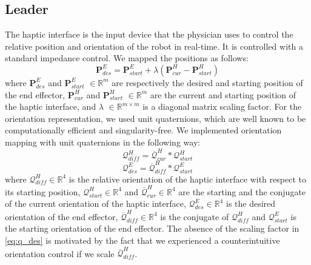 \subsection{Leader} 
The haptic interface is the input device that the physician uses to control the relative position and orientation of the robot in real-time. It is controlled with a standard impedance control. We mapped the positions as follows:
\begin{equation}
\boldsymbol{P}^E_{des} = \boldsymbol{P}^E_{start} + \lambda(\boldsymbol{P}^H_{cur} - \boldsymbol{P}^H_{start})
\end{equation}
where $\boldsymbol{P}^E_{des}$ and $\boldsymbol{P}^E_{start}$ $\in \mathbb{R}^{m}$ are respectively the desired and starting position of the end effector, $\boldsymbol{P}^H_{cur}$ and $\boldsymbol{P}^H_{start}$ $\in \mathbb{R}^{m}$ are the current and starting position of the haptic interface, and $\lambda$ $\in \mathbb{R}^{m \times m}$ is a diagonal matrix scaling factor.
For the orientation representation, we used unit quaternions, which are well known to be computationally efficient and singularity-free. We implemented orientation mapping with unit quaternions in the following way:
\begin{equation}
\mathcal{Q}^H_{diff} = \overline{\mathcal{Q}}^H_{cur} * \mathcal{Q}^H_{start}
\end{equation}
\begin{equation}
\mathcal{Q}^E_{des} =\overline{\mathcal{Q}}^H_{diff} * \mathcal{Q}^E_{start}
\label{eq:q_des}
\end{equation}
where $\mathcal{Q}^H_{diff}\in \mathbb{R}^4$ is the relative orientation of the haptic interface with respect to its starting position, $\mathcal{Q}^H_{start}\in \mathbb{R}^4$ and $\overline{\mathcal{Q}}^H_{cur} \in \mathbb{R}^4$ are the starting and the conjugate of the current orientation of the haptic interface, $\mathcal{Q}^E_{des}\in \mathbb{R}^4$ is the desired orientation of the end effector, $\overline{\mathcal{Q}}^H_{diff}\in \mathbb{R}^4$ is the conjugate of $\mathcal{Q}^H_{diff}$ and  $\mathcal{Q}^E_{start}$ is the starting orientation of the end effector. The absence of the scaling factor in \eqref{eq:q_des} is motivated by the fact that we experienced a counterintuitive orientation control if we scale $\overline{\mathcal{Q}}^H_{diff}$.
